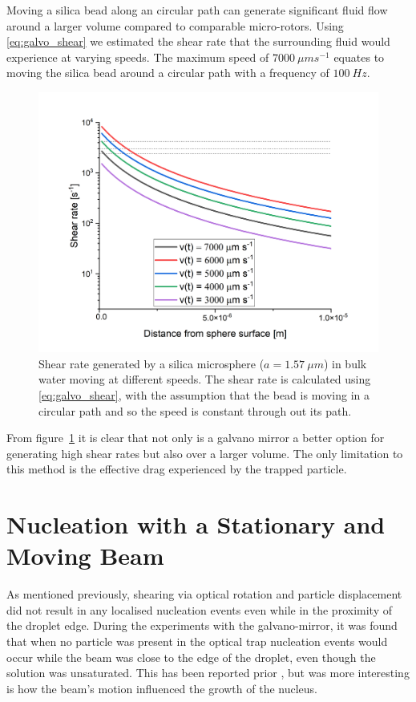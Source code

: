 Moving a silica bead along an circular path can generate significant fluid 
flow around a larger volume compared to comparable micro-rotors. Using \eqref{eq:galvo_shear} we estimated the shear rate that the surrounding fluid 
would experience at varying speeds. The maximum speed of $7000\ \mu m s^{-1}$
equates to moving the silica bead around a circular path with a frequency of 
$100\ Hz$.
\begin{figure}[h!]
	\centering
	\includegraphics[width=\linewidth]{galvano_shear_rate.png}
	\caption{Shear rate generated by a silica microsphere ($a = 1.57\ \mu m$) 
		in bulk water moving at different speeds. The shear rate is calculated 
		using \eqref{eq:galvo_shear}, with the assumption that the bead is moving
		in a circular path and so the speed is constant through out its path.}
	\label{fig:galvano_shear}
\end{figure}

From figure~\ref{fig:galvano_shear} it is clear that not only is a galvano 
mirror a better option for generating high shear rates but also over a larger 
volume. The only limitation to this method is the effective drag experienced 
by the trapped particle. 

\section{Nucleation with a Stationary and Moving Beam}
As mentioned previously, shearing via optical rotation and particle displacement
did not result in any localised nucleation events even while in the proximity of 
the droplet edge. During the experiments with the galvano-mirror, it was found 
that when no particle was present in the optical trap nucleation events would 
occur while the beam was close to the edge of the droplet, even though the solution
was unsaturated. This has been reported prior \cite{Rungsimanon2010, Liao2022}, 
but was more interesting is how the beam's motion influenced the growth of the 
nucleus.

